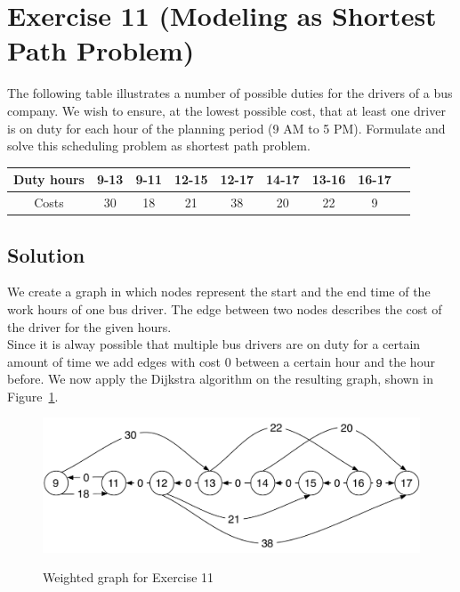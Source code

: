 \documentclass[a4paper, 12pt]{report}
\begin{document}
\section{Exercise 11 (Modeling as Shortest Path Problem)}

The following table illustrates a number of possible duties for the drivers of
a bus company. We wish to ensure, at the lowest possible cost, that at least
one driver is on duty for each hour of the planning period (9 AM to 5 PM).
Formulate and solve this scheduling problem as shortest path problem.

\begin{center}
    \begin{tabular}{|c|c|c|c|c|c|c|c|c|}
        \hline
        Duty hours  & 9-13  & 9-11  & 12-15 & 12-17 & 14-17 & 13-16 & 16-17\\
        \hline
        Costs       & 30    & 18    & 21    & 38    & 20    & 22    & 9\\
        \hline
    \end{tabular}
\end{center}

\subsection{Solution}

We create a graph in which nodes represent the start and the end time of the
work hours of one bus driver. The edge between two nodes describes the cost of
the driver for the given hours.\\

Since it is alway possible that multiple bus drivers are on duty for a certain
amount of time we add edges with cost 0 between a certain hour and the hour
before. We now apply the Dijkstra algorithm on the resulting graph, shown in
Figure~\ref{figure:Bus_Driver_Schedule}.

\begin{figure}[htbp]
    \caption{Weighted graph for Exercise 11}
    \vskip 0.2cm
    \centering
    \includegraphics[width=\textwidth]{Figures/Bus_Driver_Schedule}
    \label{figure:Bus_Driver_Schedule}
\end{figure}
\end{document}
